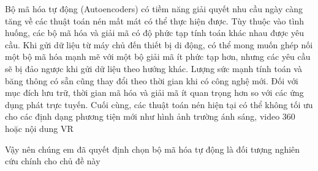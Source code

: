 Bộ mã hóa tự động (Autoencoders) có tiềm năng giải quyết nhu cầu ngày càng
tăng về các thuật
toán nén mất mát có thể thực hiện được. Tùy thuộc vào tình huống,
các bộ mã hóa và giải mã có độ phức tạp tính toán khác nhau được yêu cầu.
Khi gửi dữ liệu từ máy chủ đến thiết bị di động, có thể mong muốn ghép nối
một bộ mã hóa mạnh mẽ với một bộ giải mã ít phức tạp hơn, nhưng các yêu cầu
sẽ bị đảo ngược khi gửi dữ liệu theo hướng khác. Lượng sức mạnh tính toán và
băng thông có sẵn cũng thay đổi theo thời gian khi có công nghệ mới.
Đối với mục đích lưu trữ, thời gian mã hóa và giải mã ít quan trọng hơn
so với các ứng dụng phát trực tuyến. Cuối cùng, các thuật toán nén hiện
tại có thể không tối ưu cho các định dạng phương tiện mới như hình ảnh
trường ánh sáng, video 360 hoặc nội dung VR

Vậy nên chúng em đã quyết định chọn bộ mã hóa tự động là đối tượng nghiên 
cứu chính cho chủ đề này

